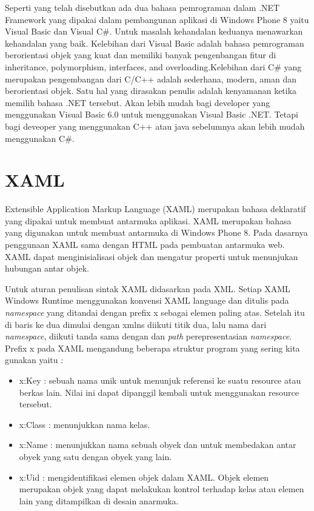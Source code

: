 \hspace{0.5cm} Seperti yang telah disebutkan ada dua bahasa pemrograman dalam .NET Framework yang dipakai dalam pembangunan aplikasi di Windows Phone 8 yaitu Visual Basic dan Visual C\#. Untuk masalah kehandalan keduanya menawarkan kehandalan yang baik. Kelebihan dari Visual Basic adalah bahasa pemrograman berorientasi objek yang kuat dan memiliki banyak pengenbangan fitur di inheritance, polymorphism, interfaces, and overloading\cite{MSDN}.Kelebihan dari C\# yang merupakan pengembangan dari C/C++ adalah sederhana, modern, aman dan berorientasi objek\cite{MSDN}. Satu hal yang dirasakan penulis adalah kenyamanan ketika memilih bahasa .NET tersebut. Akan lebih mudah bagi developer yang menggunakan Visual Basic 6.0  untuk menggunakan Visual Basic .NET. Tetapi bagi  deveoper yang menggunakan C++ atau java sebelumnya akan lebih mudah menggunakan C\#.

\section{XAML}
\label{sec:XAML}
\hspace{0.5cm} Extensible Application Markup Language (XAML) merupakan bahasa deklaratif yang dipakai untuk membuat antarmuka aplikasi. XAML merupakan bahasa yang digunakan untuk membuat antarmuka di Windows Phone 8. Pada dasarnya penggunaan XAML sama dengan HTML pada pembuatan antarmuka web. XAML dapat menginisialisasi objek dan mengatur properti untuk menunjukan hubungan antar objek.

\hspace{0.5cm} Untuk aturan penulisan sintak XAML didasarkan pada XML. Setiap XAML Windows Runtime menggunakan konvensi XAML language dan ditulis pada \textit{namespace} yang ditandai dengan prefix x sebagai elemen paling atas. Setelah itu di baris ke dua dimulai dengan xmlns diikuti titik dua, lalu nama dari \textit{namespace}, diikuti tanda sama dengan dan \textit{path} perepresentasian \textit{namespace}.
Prefix x pada XAML mengandung beberapa struktur program yang sering kita gunakan yaitu :
\begin{itemize}
	\item x:Key : sebuah nama unik untuk menunjuk referensi ke suatu resource atau berkas lain. Nilai ini dapat dipanggil kembali untuk menggunakan resource tersebut.
	\item x:Class : menunjukkan nama kelas.
	\item x:Name : menunjukkan nama sebuah obyek dan untuk membedakan antar obyek yang satu dengan obyek yang lain.
	\item x:Uid : mengidentifikasi elemen objek dalam XAML. Objek elemen merupakan objek yang dapat melakukan kontrol terhadap kelas atau elemen lain yang ditampilkan di desain anarmuka.
\end{itemize}	

